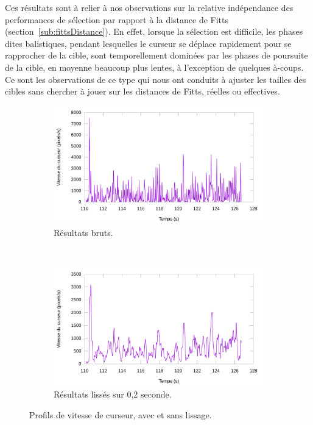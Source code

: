 	Ces résultats sont à relier à nos observations sur la relative indépendance des performances de sélection par rapport à la distance de Fitts (section~\ref{sub:fittsDistance}). En effet, lorsque la sélection est difficile, les phases dites balistiques, pendant lesquelles le curseur se déplace rapidement pour se rapprocher de la cible, sont temporellement dominées par les phases de \og poursuite \fg{} de la cible, en moyenne beaucoup plus lentes, à l'exception de quelques à-coups. Ce sont les observations de ce type qui nous ont conduits à ajuster les tailles des cibles sans chercher à jouer sur les distances de Fitts, réelles ou effectives.	
	
	\begin{figure}[!htb]
		\begin{subfigure}[t]{\textwidth}
			\centering
			\includegraphics[width=\textwidth]{figures/ch5/profile}
			\caption{Résultats bruts.}
			\label{fig:profile}
		\end{subfigure}
		~
		\begin{subfigure}[t]{\textwidth}
			\centering
			\includegraphics[width=\textwidth]{figures/ch5/profile1}
			\caption{Résultats lissés sur 0,2 seconde.}
			\label{fig:profile1}
		\end{subfigure}
		\caption[Profils de vitesse de curseurs]{Profils de vitesse de curseur, avec et sans lissage.}
		\label{fig:asProfiles}
	\end{figure}
	

